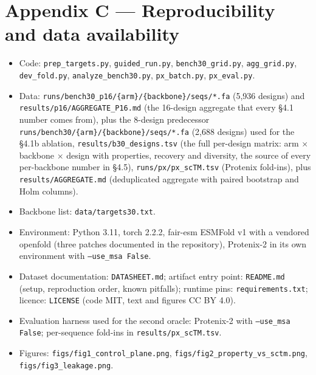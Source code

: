 \section*{Appendix C --- Reproducibility and data availability}
\label{app:reproducibility}

\begin{itemize}
\item Code: \texttt{prep\_targets.py}, \texttt{guided\_run.py},
  \texttt{bench30\_grid.py}, \texttt{agg\_grid.py}, \texttt{dev\_fold.py},
  \texttt{analyze\_bench30.py}, \texttt{px\_batch.py}, \texttt{px\_eval.py}.
\item Data: \texttt{runs/bench30\_p16/\{arm\}/\{backbone\}/seqs/*.fa} (5,936
  designs) and \texttt{results/p16/AGGREGATE\_P16.md} (the 16-design aggregate
  that every \S4.1 number comes from), plus the 8-design predecessor
  \texttt{runs/bench30/\{arm\}/\{backbone\}/seqs/*.fa} (2,688 designs) used for
  the \S4.1b ablation, \texttt{results/b30\_designs.tsv} (the full per-design
  matrix: arm $\times$ backbone $\times$ design with properties, recovery and
  diversity, the source of every per-backbone number in \S4.5),
  \texttt{runs/px/px\_scTM.tsv} (Protenix fold-ins), plus
  \texttt{results/AGGREGATE.md} (deduplicated aggregate with paired bootstrap
  and Holm columns).
\item Backbone list: \texttt{data/targets30.txt}.
\item Environment: Python 3.11, torch 2.2.2, fair-esm ESMFold v1 with a
  vendored openfold (three patches documented in the repository), Protenix-2 in
  its own environment with \texttt{--use\_msa False}.
\item Dataset documentation: \texttt{DATASHEET.md}; artifact entry point:
  \texttt{README.md} (setup, reproduction order, known pitfalls); runtime pins:
  \texttt{requirements.txt}; licence: \texttt{LICENSE} (code MIT, text and
  figures CC BY 4.0).
\item Evaluation harness used for the second oracle: Protenix-2 with
  \texttt{--use\_msa False}; per-sequence fold-ins in
  \texttt{results/px\_scTM.tsv}.
\item Figures: \texttt{figs/fig1\_control\_plane.png},
  \texttt{figs/fig2\_property\_vs\_sctm.png},
  \texttt{figs/fig3\_leakage.png}.
\end{itemize}
